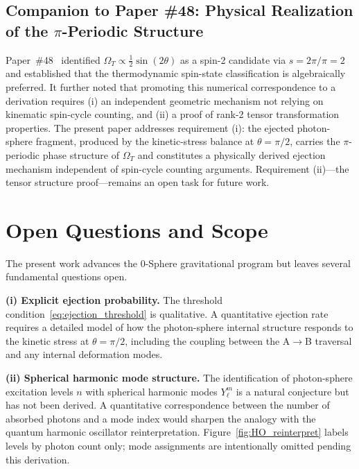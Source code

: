 \documentclass[%
 reprint, amsmath,amssymb, aps, prb, ]{revtex4-2}
\numberwithin{equation}{section}
\begin{document}
\subsection{Companion to Paper \#48: Physical Realization of the $\pi$-Periodic Structure}
\label{sec:prior_48}

Paper~\#48~\cite{hanamura48} identified $\Omega_T \propto \tfrac{1}{2}\sin(2\theta)$ as a spin-2 candidate via $s = 2\pi/\pi = 2$ and established that the thermodynamic spin-state classification is algebraically preferred. It further noted that promoting this numerical correspondence to a derivation requires (i) an independent geometric mechanism not relying on kinematic spin-cycle counting, and (ii) a proof of rank-2 tensor transformation properties. The present paper addresses requirement (i): the ejected photon-sphere fragment, produced by the kinetic-stress balance at $\theta = \pi/2$, carries the $\pi$-periodic phase structure of $\Omega_T$ and constitutes a physically derived ejection mechanism independent of spin-cycle counting arguments. Requirement (ii)---the tensor structure proof---remains an open task for future work.

\section{Open Questions and Scope}
\label{sec:open}

The present work advances the 0-Sphere gravitational program but leaves several fundamental questions open.

\textbf{(i) Explicit ejection probability.} The threshold condition~\eqref{eq:ejection_threshold} is qualitative. A quantitative ejection rate requires a detailed model of how the photon-sphere internal structure responds to the kinetic stress at $\theta = \pi/2$, including the coupling between the A$\to$B traversal and any internal deformation modes.

\textbf{(ii) Spherical harmonic mode structure.} The identification of photon-sphere excitation levels $n$ with spherical harmonic modes $Y_\ell^m$ is a natural conjecture but has not been derived. A quantitative correspondence between the number of absorbed photons and a mode index would sharpen the analogy with the quantum harmonic oscillator reinterpretation. Figure~\ref{fig:HO_reinterpret} labels levels by photon count only; mode assignments are intentionally omitted pending this derivation.
\end{document}

